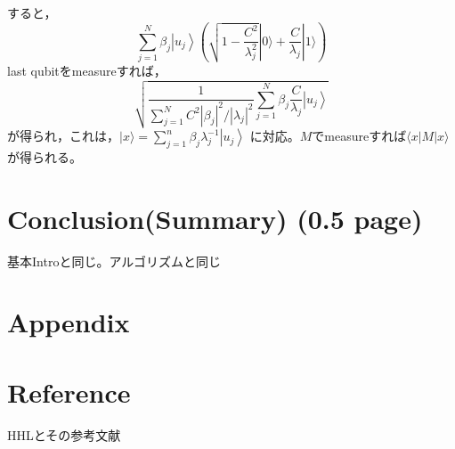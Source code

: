 \documentclass[b5paper,papersize,fleqn]{jsarticle}
\begin{document}
すると，
$$
\sum_{j=1}^{N} \beta_{j}\left|u_{j}\right\rangle\left(\sqrt{1-\frac{C^{2}}{\lambda_{j}^{2}}}|0\rangle+\frac{C}{\lambda_{j}}|1\rangle\right)
$$
last qubitをmeasureすれば，
$$
\sqrt{\frac{1}{\sum_{j=1}^{N} C^{2}\left|\beta_{j}\right|^{2} /\left|\lambda_{j}\right|^{2}} \sum_{j=1}^{N} \beta_{j} \frac{C}{\lambda_{j}}\left|u_{j}\right\rangle}
$$
が得られ，これは，$|x\rangle=\sum_{j=1}^{n} \beta_{j} \lambda_{j}^{-1}\left|u_{j}\right\rangle$ に対応。$M$でmeasureすれば$\langle x|M| x\rangle$が得られる。
%
%


\section{Conclusion(Summary) (0.5 page)}
基本Introと同じ。アルゴリズムと同じ

\section{Appendix}


\section{Reference}
HHLとその参考文献
\end{document}
